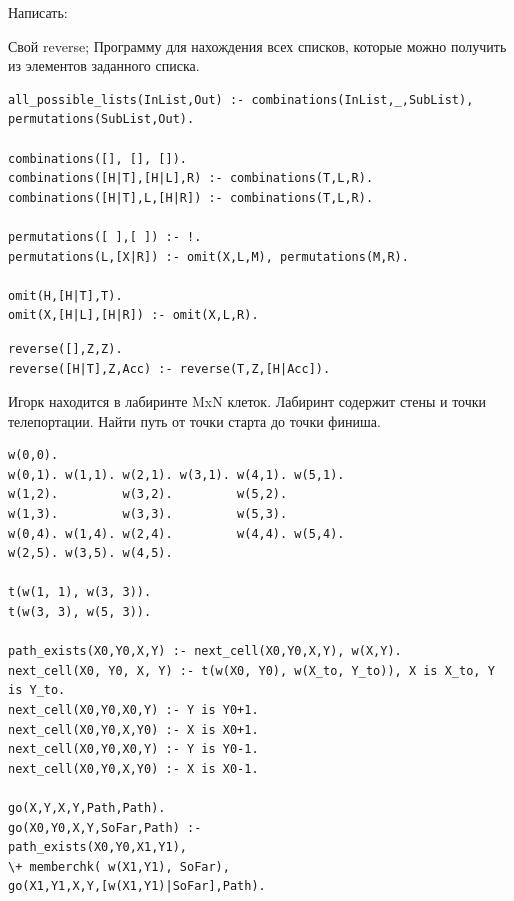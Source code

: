 Написать:
\begin{tasks}[label=\arabic*]
	\task Свой reverse;
	\task Программу для нахождения всех списков, которые можно получить из элементов заданного списка.
\end{tasks}

\begin{lstlisting}
all_possible_lists(InList,Out) :- combinations(InList,_,SubList), permutations(SubList,Out).

combinations([], [], []).
combinations([H|T],[H|L],R) :- combinations(T,L,R).
combinations([H|T],L,[H|R]) :- combinations(T,L,R).

permutations([ ],[ ]) :- !.
permutations(L,[X|R]) :- omit(X,L,M), permutations(M,R).

omit(H,[H|T],T).
omit(X,[H|L],[H|R]) :- omit(X,L,R).
\end{lstlisting}

\begin{lstlisting}
reverse([],Z,Z).
reverse([H|T],Z,Acc) :- reverse(T,Z,[H|Acc]).
\end{lstlisting}

Игорк находится в лабиринте MxN клеток. Лабиринт содержит стены и точки телепортации. Найти путь от точки старта до точки финиша. 
\begin{lstlisting}
w(0,0).
w(0,1). w(1,1). w(2,1). w(3,1). w(4,1). w(5,1).
w(1,2).         w(3,2).         w(5,2).
w(1,3).         w(3,3).         w(5,3).
w(0,4). w(1,4). w(2,4).         w(4,4). w(5,4).
w(2,5). w(3,5). w(4,5).

t(w(1, 1), w(3, 3)).
t(w(3, 3), w(5, 3)).

path_exists(X0,Y0,X,Y) :- next_cell(X0,Y0,X,Y), w(X,Y).
next_cell(X0, Y0, X, Y) :- t(w(X0, Y0), w(X_to, Y_to)), X is X_to, Y is Y_to.
next_cell(X0,Y0,X0,Y) :- Y is Y0+1.
next_cell(X0,Y0,X,Y0) :- X is X0+1.
next_cell(X0,Y0,X0,Y) :- Y is Y0-1.
next_cell(X0,Y0,X,Y0) :- X is X0-1.

go(X,Y,X,Y,Path,Path).
go(X0,Y0,X,Y,SoFar,Path) :-
path_exists(X0,Y0,X1,Y1),
\+ memberchk( w(X1,Y1), SoFar),
go(X1,Y1,X,Y,[w(X1,Y1)|SoFar],Path).
\end{lstlisting}